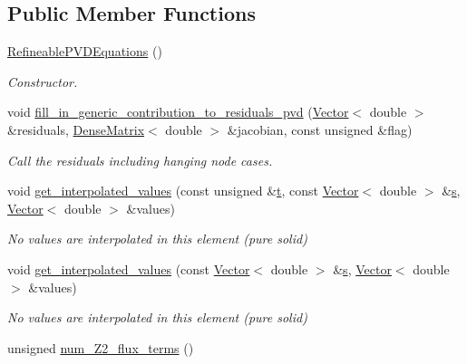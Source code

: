 \subsection*{Public Member Functions}
\begin{DoxyCompactItemize}
\item 
\hyperlink{classoomph_1_1RefineablePVDEquations_a048037883cc058f0b34950af08ef841f}{Refineable\+P\+V\+D\+Equations} ()
\begin{DoxyCompactList}\small\item\em Constructor. \end{DoxyCompactList}\item 
void \hyperlink{classoomph_1_1RefineablePVDEquations_ace1bda5ddd0cecac296f8b5c3a053a21}{fill\+\_\+in\+\_\+generic\+\_\+contribution\+\_\+to\+\_\+residuals\+\_\+pvd} (\hyperlink{classoomph_1_1Vector}{Vector}$<$ double $>$ \&residuals, \hyperlink{classoomph_1_1DenseMatrix}{Dense\+Matrix}$<$ double $>$ \&jacobian, const unsigned \&flag)
\begin{DoxyCompactList}\small\item\em Call the residuals including hanging node cases. \end{DoxyCompactList}\item 
void \hyperlink{classoomph_1_1RefineablePVDEquations_a94defe5e7d281500b191d8bae6cfb2f1}{get\+\_\+interpolated\+\_\+values} (const unsigned \&\hyperlink{cfortran_8h_af6f0bd3dc13317f895c91323c25c2b8f}{t}, const \hyperlink{classoomph_1_1Vector}{Vector}$<$ double $>$ \&\hyperlink{cfortran_8h_ab7123126e4885ef647dd9c6e3807a21c}{s}, \hyperlink{classoomph_1_1Vector}{Vector}$<$ double $>$ \&values)
\begin{DoxyCompactList}\small\item\em No values are interpolated in this element (pure solid) \end{DoxyCompactList}\item 
void \hyperlink{classoomph_1_1RefineablePVDEquations_a2e49057699c62727015cdbf1343be157}{get\+\_\+interpolated\+\_\+values} (const \hyperlink{classoomph_1_1Vector}{Vector}$<$ double $>$ \&\hyperlink{cfortran_8h_ab7123126e4885ef647dd9c6e3807a21c}{s}, \hyperlink{classoomph_1_1Vector}{Vector}$<$ double $>$ \&values)
\begin{DoxyCompactList}\small\item\em No values are interpolated in this element (pure solid) \end{DoxyCompactList}\item 
unsigned \hyperlink{classoomph_1_1RefineablePVDEquations_a1c3251344b800eff097da2ce76a127fc}{num\+\_\+\+Z2\+\_\+flux\+\_\+terms} ()

\end{DoxyCompactItemize}
